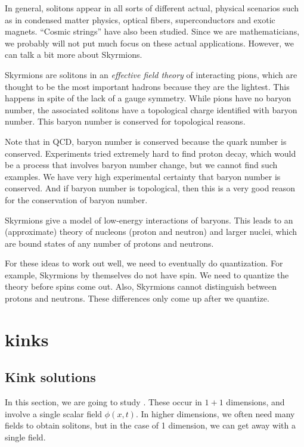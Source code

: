 \documentclass[a4paper]{article}
\begin{document}
In general, solitons appear in all sorts of different actual, physical scenarios such as in condensed matter physics, optical fibers, superconductors and exotic magnets. ``Cosmic strings'' have also been studied. Since we are mathematicians, we probably will not put much focus on these actual applications. However, we can talk a bit more about Skyrmions.

Skyrmions are solitons in an \emph{effective field theory} of interacting pions, which are thought to be the most important hadrons because they are the lightest. This happens in spite of the lack of a gauge symmetry. While pions have no baryon number, the associated solitons have a topological charge identified with baryon number. This baryon number is conserved for topological reasons.

Note that in QCD, baryon number is conserved because the quark number is conserved. Experiments tried extremely hard to find proton decay, which would be a process that involves baryon number change, but we cannot find such examples. We have very high experimental certainty that baryon number is conserved. And if baryon number is topological, then this is a very good reason for the conservation of baryon number.

Skyrmions give a model of low-energy interactions of baryons. This leads to an (approximate) theory of nucleons (proton and neutron) and larger nuclei, which are bound states of any number of protons and neutrons.

For these ideas to work out well, we need to eventually do quantization. For example, Skyrmions by themselves do not have spin. We need to quantize the theory before spins come out. Also, Skyrmions cannot distinguish between protons and neutrons. These differences only come up after we quantize.

\section{ kinks}
\subsection{Kink solutions}
In this section, we are going to study . These occur in $1 + 1$ dimensions, and involve a single scalar field $\phi(x, t)$. In higher dimensions, we often need many fields to obtain solitons, but in the case of 1 dimension, we can get away with a single field.
\end{document}
